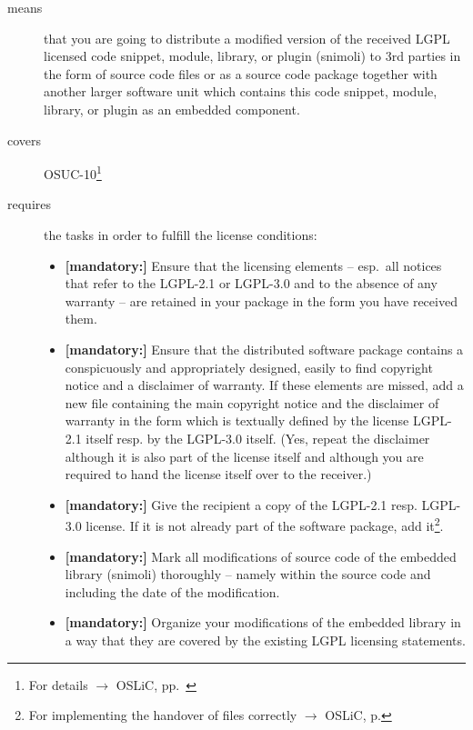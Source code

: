 \begin{description}
\item[means] that you are going to distribute a modified version of the received
LGPL licensed code snippet, module, library, or plugin (snimoli) to 3rd parties
in the form of source code files or as a source code package together with
another larger software unit which contains this code snippet, module, library,
or plugin as an embedded component.
\item[covers] OSUC-10\footnote{For details $\rightarrow$ OSLiC, pp.\ \pageref{OSUC-10-DEF}}
\item[requires] the tasks in order to fulfill the license conditions:
\begin{itemize}


  \item \textbf{[mandatory:]} Ensure that the licensing elements -- esp.\ all
  notices that refer to the LGPL-2.1 or LGPL-3.0 and to the absence of any
  warranty -- are retained in your package in the form you have received them.

  \item \textbf{[mandatory:]} Ensure that the distributed software package
  contains a conspicuously and appropriately designed, easily to find copyright
  notice and a disclaimer of warranty. If these elements are missed, add a new
  file containing the main copyright notice and the disclaimer of warranty in the
  form which is textually defined by the license LGPL-2.1 itself resp. by the
  LGPL-3.0 itself. (Yes, repeat the disclaimer although it is also part of the
  license itself and although you are required to hand the license itself over
  to the receiver.)
  
  \item \textbf{[mandatory:]} Give the recipient a copy of the LGPL-2.1 resp.
  LGPL-3.0 license. If it is not already part of the software package, add
  it\footnote{For implementing the handover of files correctly $\rightarrow$
  OSLiC, p. \pageref{DistributingFilesHint}}.
    
  \item \textbf{[mandatory:]} Mark all modifications of source code of the
  embedded library (snimoli) thoroughly -- namely within the source code and
  including the date of the modification.
  
  \item \textbf{[mandatory:]} Organize your modifications of the embedded
  library in a way that they are covered by the existing LGPL licensing
  statements. 


\end{itemize}
\end{description}
